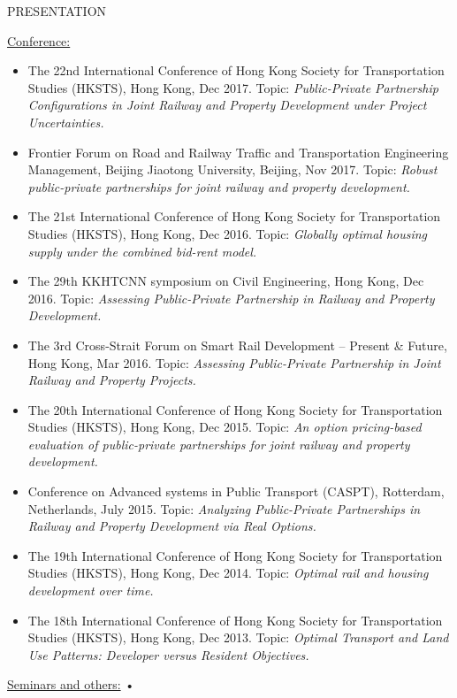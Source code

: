 \documentclass{resume} %
\begin{document}
\begin{rSection}{PRESENTATION}

\underline{Conference:}
\begin{itemize} \itemsep -3pt
\item The 22nd International Conference of Hong Kong Society for Transportation
Studies (HKSTS), Hong Kong, Dec 2017. Topic: \textit{Public-Private Partnership
Configurations in Joint Railway and Property Development under Project Uncertainties.}
\item Frontier Forum on Road and Railway Traffic and Transportation Engineering
Management, Beijing Jiaotong University, Beijing, Nov 2017. Topic: \textit{Robust
public-private partnerships for joint railway and property development.}
\item The 21st International Conference of Hong Kong Society for Transportation
Studies (HKSTS), Hong Kong, Dec 2016. Topic: \textit{Globally optimal housing supply under
the combined bid-rent model.}
\item The 29th KKHTCNN symposium on Civil Engineering, Hong Kong, Dec 2016.
Topic: \textit{Assessing Public-Private Partnership in Railway and Property Development.}
\item The 3rd Cross-Strait Forum on Smart Rail Development – Present \& Future,
Hong Kong, Mar 2016. Topic: \textit{Assessing Public-Private Partnership in Joint Railway and
Property Projects.}
\item The 20th International Conference of Hong Kong Society for Transportation
Studies (HKSTS), Hong Kong, Dec 2015. Topic: \textit{An option pricing-based evaluation of
public-private partnerships for joint railway and property development.}
\item Conference on Advanced systems in Public Transport (CASPT), Rotterdam,
Netherlands, July 2015. Topic: \textit{Analyzing Public-Private Partnerships in Railway and
Property Development via Real Options.}
\item The 19th International Conference of Hong Kong Society for Transportation
Studies (HKSTS), Hong Kong, Dec 2014. Topic: \textit{Optimal rail and housing development
over time.}
\item The 18th International Conference of Hong Kong Society for Transportation
Studies (HKSTS), Hong Kong, Dec 2013. Topic: \textit{Optimal Transport and Land Use
Patterns: Developer versus Resident Objectives.}
\end{itemize}
\underline{Seminars and others:}
• \begin{itemize} \itemsep -3pt

\end{itemize}
\end{rSection}
\end{document}
